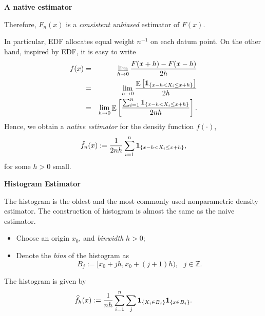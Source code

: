 \documentclass[19pt,landscaoe]{article}
\newcommand{\bone}{{\bf 1}}
\DeclareMathOperator{\E}{\mathbb{E}}
\newcommand{\Z}{\mathbb{Z}}
\begin{document}
\newpage
{\LARGE\centerline{\textbf{A native estimator}}}
\vskip25pt
\begin{minipage}{.9\textwidth}
    \Large 
    Therefore, $F_n(x)$ is a {\it consistent unbiased} estimator of $F(x)$. 

    \vskip 5pt
    In particular, EDF allocates equal weight $n^{-1}$ on each datum point.
    \vskip 5pt
    On the other hand, inspired by EDF, it is easy to write 
    \begin{eqnarray*}
        f(x)&=&\lim_{h\to0}\frac{F(x+h)-F(x-h)}{2h}\\
        &=&\lim_{h\to0}\frac{\E\left[\bone_{\{x-h<X_i\le x+h\}}\right]}{2h}\\
        &=&\lim_{h\to0}\E\left[\frac{\sum_{i=1}^n\bone_{\{x-h<X_i\le x+h\}}}{2nh}\right].
    \end{eqnarray*}
    Hence, we obtain a {\it native estimator} for the density function $f(\cdot)$, 
\begin{equation}\label{def-nat}
    \hat{f}_n(x):=\frac1{2nh}\sum_{i=1}^n\bone_{\{x-h<X_i\le x+h\}},
\end{equation}
    for some $h>0$ small. 
\end{minipage}

\newpage
{\LARGE\centerline{\textbf{Histogram Estimator}}}
\vskip25pt
\begin{minipage}{.9\textwidth}
    \Large
The histogram is the oldest and the most commonly used nonparametric density estimator. The construction of histogram is almost the same as the naive estimator.  
\begin{itemize}
   \item Choose an origin $x_0$, and {\it binwidth} $h>0$;
   \item Denote the {\it bins} of the histogram as 
   $$B_j:=[x_0+jh,x_0+(j+1)h),~~~j\in\Z.$$
\end{itemize}
The histogram is given by 
\begin{equation}\label{def-hist}
    \widehat{f}_h(x):=\frac1{nh}\sum_{i=1}^n\sum_{j}\bone_{\{X_i\in B_j\}}\bone_{\{x\in B_j\}}.
\end{equation}
\end{minipage}
   
\end{document}
